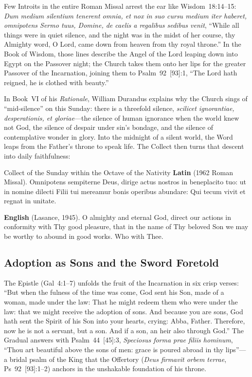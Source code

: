 Few Introits in the entire Roman Missal arrest the ear like Wisdom~18:14--15:
\textit{Dum medium silentium tenerent omnia, et nox in suo cursu medium iter
haberet, omnipotens Sermo tuus, Domine, de caelis a regalibus sedibus venit},
``While all things were in quiet silence, and the night was in the midst of her
course, thy Almighty word, O Lord, came down from heaven from thy royal
throne.'' In the Book of Wisdom, those lines describe the Angel of the Lord
leaping down into Egypt on the Passover night; the Church takes them onto her
lips for the greater Passover of the Incarnation, joining them to
Psalm~92~[93]:1, ``The Lord hath reigned, he is clothed with beauty.''

In Book~VI of his \textit{Rationale}, William Durandus explains why the Church
sings of ``mid-silence'' on this Sunday: there is a threefold silence,
\textit{scilicet ignorantiae, desperationis, et gloriae}---the silence of human
ignorance when the world knew not God, the silence of despair under sin's
bondage, and the silence of contemplative wonder in glory. Into the midnight of
a silent world, the Word leaps from the Father's throne to speak life. The
Collect then turns that descent into daily faithfulness:

\begin{massbox}{Collect of the Sunday within the Octave of the Nativity}
\textbf{Latin} (1962 Roman Missal). Omnipotens sempiterne Deus, dirige actus
nostros in beneplacito tuo: ut in nomine dilecti Filii tui mereamur bonis
operibus abundare: Qui tecum vivit et regnat in unitate.

\textbf{English} (Lasance, 1945). O almighty and eternal God, direct our actions
in conformity with Thy good pleasure, that in the name of Thy beloved Son we may
be worthy to abound in good works. Who with Thee.
\end{massbox}

\subsection{Adoption as Sons and the Sword Foretold}

The Epistle (Gal~4:1--7) unfolds the fruit of the Incarnation in six crisp
verses: ``But when the fulness of the time was come, God sent his Son, made of a
woman, made under the law: That he might redeem them who were under the law:
that we might receive the adoption of sons. And because you are sons, God hath
sent the Spirit of his Son into your hearts, crying: Abba, Father. Therefore,
now he is not a servant, but a son. And if a son, an heir also through God.''
The Gradual answers with Psalm~44~[45]:3, \textit{Speciosus forma prae filiis
hominum}, ``Thou art beautiful above the sons of men: grace is poured abroad in
thy lips''---a bridal psalm of the King that the Offertory (\textit{Deus
firmavit orbem terrae}, Ps~92~[93]:1--2) anchors in the unshakable foundation
of his throne.

